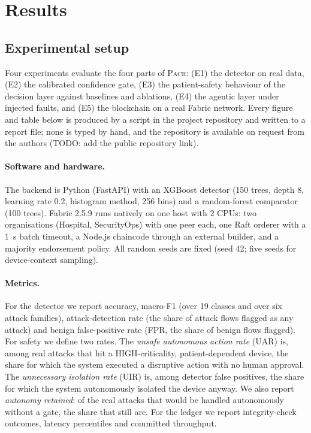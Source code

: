 \documentclass[preprint,12pt]{elsarticle}
\newcommand{\pacr}{\textsc{Pacr}}
\begin{document}

\section{Results}
\label{sec:results}

\subsection{Experimental setup}
\label{sec:setup}
Four experiments evaluate the four parts of \pacr: (E1) the detector on real data, (E2) the calibrated confidence gate, (E3) the patient-safety behaviour of the decision layer against baselines and ablations, (E4) the agentic layer under injected faults, and (E5) the blockchain on a real Fabric network. Every figure and table below is produced by a script in the project repository and written to a report file; none is typed by hand, and the repository is available on request from the authors (TODO: add the public repository link).

\paragraph{Software and hardware.}
The backend is Python (FastAPI) with an XGBoost detector (150 trees, depth 8, learning rate 0.2, histogram method, 256 bins) and a random-forest comparator (100 trees). Fabric 2.5.9 runs natively on one host with 2 CPUs: two organisations (Hospital, SecurityOps) with one peer each, one Raft orderer with a 1~s batch timeout, a Node.js chaincode through an external builder, and a majority endorsement policy. All random seeds are fixed (seed 42; five seeds for device-context sampling).

\paragraph{Metrics.}
For the detector we report accuracy, macro-F1 (over 19 classes and over six attack families), attack-detection rate (the share of attack flows flagged as any attack) and benign false-positive rate (FPR, the share of benign flows flagged). For safety we define two rates. The \emph{unsafe autonomous action rate} (UAR) is, among real attacks that hit a HIGH-criticality, patient-dependent device, the share for which the system executed a disruptive action with no human approval. The \emph{unnecessary isolation rate} (UIR) is, among detector false positives, the share for which the system autonomously isolated the device anyway. We also report \emph{autonomy retained}: of the real attacks that would be handled autonomously without a gate, the share that still are. For the ledger we report integrity-check outcomes, latency percentiles and committed throughput.
\end{document}
